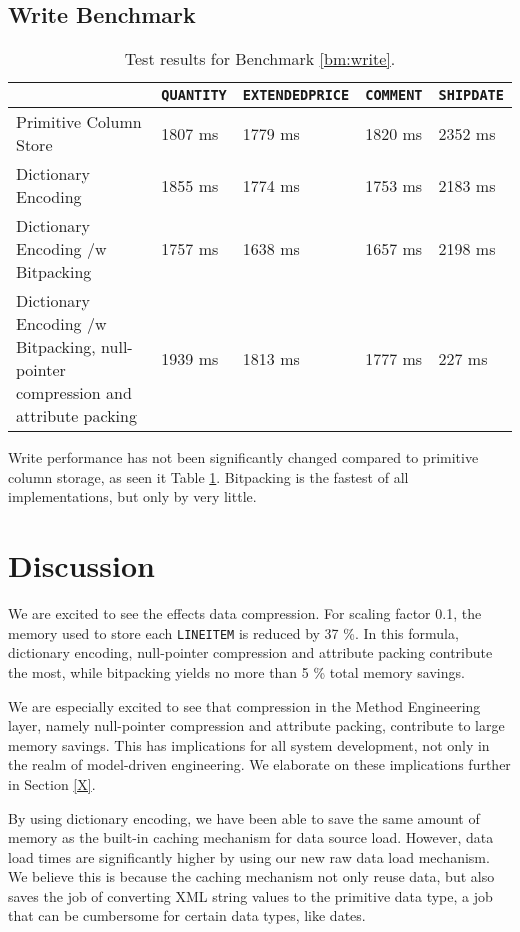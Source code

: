 \subsection{Write Benchmark}
\label{sub:compression-write-benchmark}
\begin{table}
    \begin{tabularx}{\textwidth}{X | X X X X}
         & \texttt{QUANTITY} & \texttt{EXTENDEDPRICE} & \texttt{COMMENT} & \texttt{SHIPDATE}\\ 
        \hline
        \hline
        Primitive Column Store & 1807 ms & 1779 ms & 1820 ms & 2352 ms \\
        Dictionary Encoding & 1855 ms & 1774 ms & 1753 ms & 2183 ms \\
        Dictionary Encoding /w Bitpacking & 1757 ms & 1638 ms & 1657 ms & 2198 ms \\
        Dictionary Encoding /w Bitpacking, null-pointer compression and attribute packing & 1939 ms & 1813 ms & 1777 ms & 227 ms \\
    \end{tabularx}
    \caption{Test results for Benchmark \ref{bm:write}.}
    \label{tab:compression-write}
\end{table}
Write performance has not been significantly changed compared to primitive column storage, as seen it Table \ref{tab:compression-write}. Bitpacking is the fastest of all implementations, but only by very little.

\section{Discussion}
\label{sec:compression-discussion}
We are excited to see the effects data compression. For scaling factor 0.1, the memory used to store each \texttt{LINEITEM} is reduced by 37 \%. In this formula, dictionary encoding, null-pointer compression and attribute packing contribute the most, while bitpacking yields no more than 5 \% total memory savings. 

We are especially excited to see that compression in the Method Engineering layer, namely null-pointer compression and attribute packing, contribute to large memory savings. This has implications for all system development, not only in the realm of model-driven engineering. We elaborate on these implications further in Section \ref{X}.

By using dictionary encoding, we have been able to save the same amount of memory as the built-in caching mechanism for data source load. However, data load times are significantly higher by using our new raw data load mechanism. We believe this is because the caching mechanism not only reuse data, but also saves the job of converting XML string values to the primitive data type, a job that can be cumbersome for certain data types, like dates.

